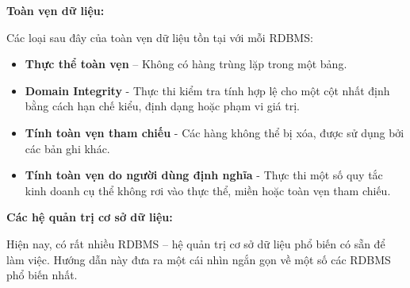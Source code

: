 \textbf{Toàn vẹn dữ liệu:}
\par
Các loại sau đây của toàn vẹn dữ liệu tồn tại với mỗi RDBMS:
\begin{itemize}
    \item \textbf{Thực thể toàn vẹn} – Không có hàng trùng lặp trong một bảng.
    \item \textbf{Domain Integrity} -  Thực thi kiểm tra tính hợp lệ cho một cột nhất định bằng cách hạn chế kiểu, định dạng hoặc phạm vi giá trị.
    \item \textbf{Tính toàn vẹn tham chiếu} - Các hàng không thể bị xóa, được sử dụng bởi các bản ghi khác.
    \item \textbf{Tính toàn vẹn do người dùng định nghĩa} - Thực thi một số quy tắc kinh doanh cụ thể không rơi vào thực thể, miền hoặc toàn vẹn tham chiếu.
\end{itemize}
\textbf{Các hệ quản trị cơ sở dữ liệu:}
\par
Hiện nay, có rất nhiều RDBMS – hệ quản trị cơ sở dữ liệu phổ biến có sẵn để làm việc. Hướng dẫn này đưa ra một cái nhìn ngắn gọn về một số các RDBMS phổ biến nhất.
